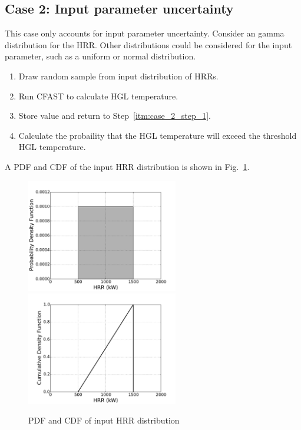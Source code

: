 \documentclass[12pt]{article}
\begin{document}
\clearpage


\subsection{Case 2: Input parameter uncertainty}

This case only accounts for input parameter uncertainty. Consider an gamma distribution for the HRR. Other distributions could be considered for the input parameter, such as a uniform or normal distribution.

\begin{enumerate}
\item Draw random sample from input distribution of HRRs.
\label{itm:case_2_step_1}
\item Run CFAST to calculate HGL temperature.
\item Store value and return to Step~\ref{itm:case_2_step_1}.
\item Calculate the probaility that the HGL temperature will exceed the threshold HGL temperature.
\end{enumerate}


\clearpage


A PDF and CDF of the input HRR distribution is shown in Fig.~\ref{fig:case_2_input_distributions}.

\begin{figure}[!ht]
\includegraphics[width=2.6in]{Figures/input_PDF}
\includegraphics[width=2.6in]{Figures/input_CDF}
\caption{PDF and CDF of input HRR distribution}
\label{fig:case_2_input_distributions}
\end{figure}
\end{document}
